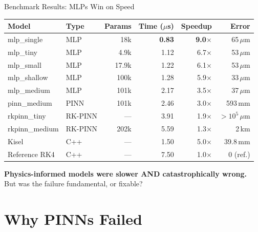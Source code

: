 \documentclass[aspectratio=169, 11pt]{beamer}
\begin{document}
\begin{frame}{Benchmark Results: MLPs Win on Speed}
  \centering
  \begin{tabular}{llrrrr}
    \toprule
    \textbf{Model} & \textbf{Type} & \textbf{Params} & \textbf{Time ($\mu$s)} & \textbf{Speedup} & \textbf{Error} \\
    \midrule
    \rowcolor{nngreen!10} mlp\_single & MLP & 18k & \textbf{0.83} & \textbf{9.0$\times$} & 65\,$\mu$m \\
    \rowcolor{nngreen!10} mlp\_tiny & MLP & 4.9k & 1.12 & 6.7$\times$ & 53\,$\mu$m \\
    mlp\_small & MLP & 17.9k & 1.22 & 6.1$\times$ & 53\,$\mu$m \\
    mlp\_shallow & MLP & 100k & 1.28 & 5.9$\times$ & 33\,$\mu$m \\
    mlp\_medium & MLP & 101k & 2.17 & 3.5$\times$ & 37\,$\mu$m \\
    \midrule
    pinn\_medium & PINN & 101k & 2.46 & 3.0$\times$ & \textcolor{rk4red}{593\,mm} \\
    rkpinn\_tiny & RK-PINN & --- & 3.91 & 1.9$\times$ & \textcolor{rk4red}{$>10^5$\,$\mu$m} \\
    rkpinn\_medium & RK-PINN & 202k & 5.59 & 1.3$\times$ & \textcolor{rk4red}{2\,km} \\
    \midrule
    Kisel & C++ & --- & 1.50 & 5.0$\times$ & 39.8\,mm \\
    Reference RK4 & C++ & --- & 7.50 & 1.0$\times$ & 0 (ref.) \\
    \bottomrule
  \end{tabular}

  \bigskip
  \textcolor{rk4red}{\textbf{Physics-informed models were slower AND catastrophically wrong.}} \\
  \textcolor{lhcbblue}{But was the failure fundamental, or fixable?}
\end{frame}

\section{Why PINNs Failed}
\end{document}
